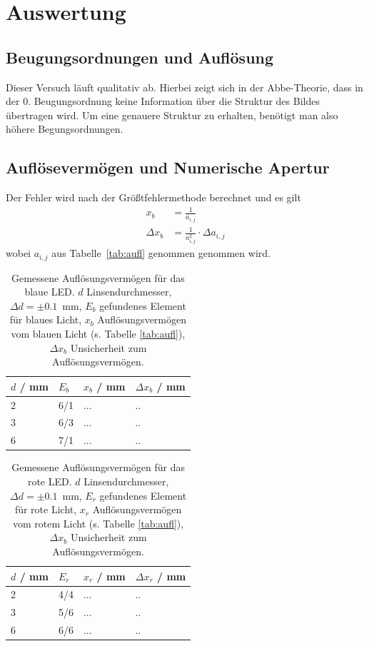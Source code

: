 \documentclass{article}
\begin{document}
\newpage



\section{Auswertung}

\subsection{Beugungsordnungen und Auflösung}

Dieser Versuch läuft qualitativ ab. Hierbei zeigt sich in der Abbe-Theorie, dass in der 0. Beugungsordnung keine Information über die Struktur des Bildes übertragen wird. Um eine genauere Struktur zu erhalten, benötigt man also höhere Begungsordnungen.




\subsection{Auflösevermögen und Numerische Apertur}


Der Fehler wird nach der Größtfehlermethode berechnet und es gilt
\begin{align*}
x_b &= \frac{1}{a_{i,j}} \\
\Delta x_b &= \frac{1}{a_{i,j}^2}\cdot \Delta a_{i,j}
\end{align*}
wobei $a_{i,j}$ aus Tabelle~\ref{tab:aufl} genommen genommen wird. 


\begin{table}[H]
\caption{Gemessene Auflösungsvermögen für das blaue LED. $d$ Linsendurchmesser, $\Delta d = \pm 0.1$~mm, $E_b$ gefundenes Element für blaues Licht, $x_b$ Auflösungsvermögen vom blauen Licht (s. Tabelle \ref{tab:aufl}), $\Delta x_b$ Unsicherheit zum Auflösungsvermögen.}

\begin{tabular}{llll}
$d$ / mm & $E_b$ & $x_b$ / mm & $\Delta x_b$ / mm \\
\hline
2 & 6/1 & ... & .. \\
3 & 6/3 & ... & .. \\
6 & 7/1 & ... & .. 
\end{tabular}
\end{table}


\begin{table}[H]
\caption{Gemessene Auflösungsvermögen für das rote LED. $d$ Linsendurchmesser, $\Delta d = \pm 0.1$~mm, $E_r$ gefundenes Element für rote Licht, $x_r$ Auflösungsvermögen vom rotem Licht (s. Tabelle \ref{tab:aufl}), $\Delta x_b$ Unsicherheit zum Auflösungsvermögen.}

\begin{tabular}{llll}
$d$ / mm & $E_r$ & $x_r$ / mm & $\Delta x_r$ / mm \\
\hline
2 & 4/4 & ... & .. \\
3 & 5/6 & ... & .. \\
6 & 6/6 & ... & .. 
\end{tabular}
\end{table}
\end{document}
